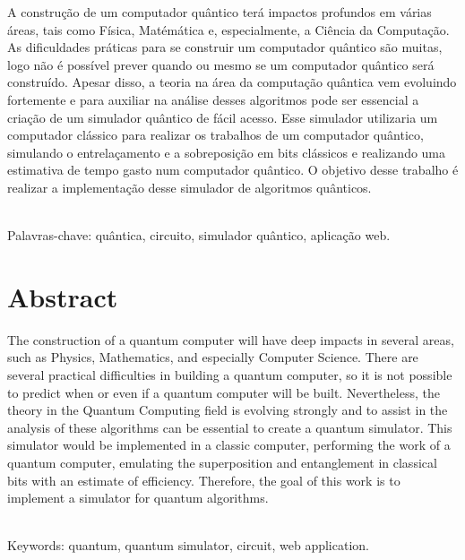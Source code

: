 \documentclass[a4paper, 12pt, oneside]{book}
\begin{document}
\thispagestyle{myheadings}

A construção de um computador quântico terá impactos profundos em várias áreas, tais como Física, Matémática e, especialmente, a Ciência da Computação. As dificuldades práticas para se construir um computador quântico são muitas, logo não é possível prever quando ou mesmo se um computador quântico será construído. Apesar disso, a teoria na área da computação quântica vem evoluindo fortemente e para auxiliar na análise desses algoritmos pode ser essencial a criação de um simulador quântico de fácil acesso. Esse simulador utilizaria um computador clássico para realizar os trabalhos de um computador quântico, simulando o entrelaçamento e a sobreposição em bits clássicos e realizando uma estimativa de tempo gasto num computador quântico. O objetivo desse trabalho é realizar a implementação desse simulador de algoritmos quânticos.

\ \\

Palavras-chave: quântica, circuito, simulador quântico, aplicação web. 


\chapter*{Abstract}

\thispagestyle{myheadings}

The construction of a quantum computer will have deep impacts in several areas, such as Physics, Mathematics, and especially Computer Science. There are several practical difficulties in building a quantum computer, so it is not possible to predict when or even if a quantum computer will be built. Nevertheless, the theory in the Quantum Computing field is evolving strongly and to assist in the analysis of these algorithms can be essential to create a quantum simulator. This simulator would be implemented in a classic computer, performing the work of a quantum computer, emulating the superposition and entanglement in classical bits with an estimate of efficiency. Therefore, the goal of this work is to implement a simulator for quantum algorithms.

\ \\

Keywords: quantum, quantum simulator, circuit, web application.

\end{document}
